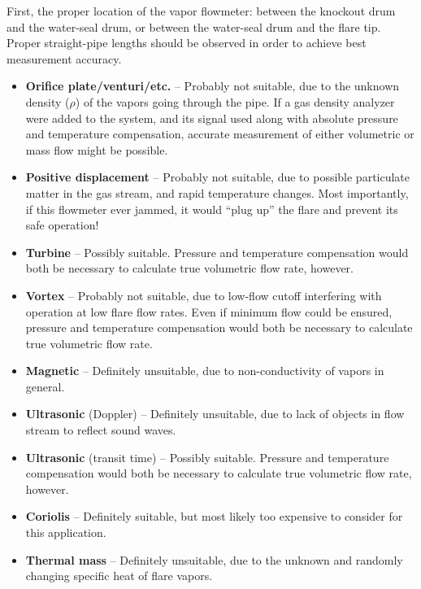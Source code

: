 
First, the proper location of the vapor flowmeter: between the knockout drum and the water-seal drum, or between the water-seal drum and the flare tip.  Proper straight-pipe lengths should be observed in order to achieve best measurement accuracy.

\vskip 10pt

\begin{itemize}
\item{} {\bf Orifice plate/venturi/etc.} -- Probably not suitable, due to the unknown density ($\rho$) of the vapors going through the pipe.  If a gas density analyzer were added to the system, and its signal used along with absolute pressure and temperature compensation, accurate measurement of either volumetric or mass flow might be possible.
\vskip 10pt
\item{} {\bf Positive displacement} -- Probably not suitable, due to possible particulate matter in the gas stream, and rapid temperature changes.  Most importantly, if this flowmeter ever jammed, it would ``plug up'' the flare and prevent its safe operation!
\vskip 10pt
\item{} {\bf Turbine} -- Possibly suitable.  Pressure and temperature compensation would both be necessary to calculate true volumetric flow rate, however.
\vskip 10pt
\item{} {\bf Vortex} -- Probably not suitable, due to low-flow cutoff interfering with operation at low flare flow rates.  Even if minimum flow could be ensured, pressure and temperature compensation would both be necessary to calculate true volumetric flow rate.
\vskip 10pt
\item{} {\bf Magnetic} -- Definitely unsuitable, due to non-conductivity of vapors in general.
\vskip 10pt
\item{} {\bf Ultrasonic} (Doppler) -- Definitely unsuitable, due to lack of objects in flow stream to reflect sound waves. 
\vskip 10pt
\item{} {\bf Ultrasonic} (transit time) -- Possibly suitable.  Pressure and temperature compensation would both be necessary to calculate true volumetric flow rate, however.
\vskip 10pt
\item{} {\bf Coriolis} -- Definitely suitable, but most likely too expensive to consider for this application.
\vskip 10pt
\item{} {\bf Thermal mass} -- Definitely unsuitable, due to the unknown and randomly changing specific heat of flare vapors.
\end{itemize}

 










